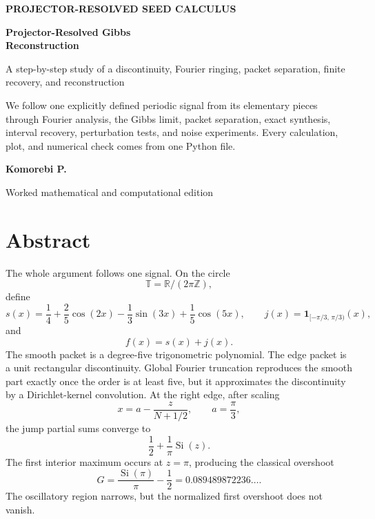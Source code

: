\documentclass[11pt,oneside]{book}
\theoremstyle{remark}
\newcommand{\Torus}{\mathbb T}
\newcommand{\R}{\mathbb R}
\newcommand{\Z}{\mathbb Z}
\newcommand{\Si}{\operatorname{Si}}
\begin{document}
\begin{titlepage}
\thispagestyle{empty}
\centering
{}
\vspace*{0.52in}
{\large\color{Blue}\bfseries PROJECTOR-RESOLVED SEED CALCULUS\par}
\vspace{0.18in}
{\fontsize{32}{37}\selectfont\bfseries Projector-Resolved Gibbs\\Reconstruction\par}
\vspace{0.14in}
{\fontsize{20}{24}\selectfont\color{Muted} A step-by-step study of a discontinuity, Fourier ringing, packet separation, finite recovery, and reconstruction\par}
\vspace{0.42in}
\begin{minipage}{0.83\linewidth}
\large
We follow one explicitly defined periodic signal from its elementary pieces through Fourier analysis, the Gibbs limit, packet separation, exact synthesis, interval recovery, perturbation tests, and noise experiments. Every calculation, plot, and numerical check comes from one Python file.
\end{minipage}
\vfill
{\Large\bfseries Komorebi P.\par}
\vspace{0.25in}
{\large Worked mathematical and computational edition\par}
\end{titlepage}

\frontmatter

\chapter*{Abstract}
The whole argument follows one signal. On the circle
\[
\Torus=\R/(2\pi\Z),
\]
define
\[
 s(x)=\frac14+\frac25\cos(2x)-\frac13\sin(3x)+\frac15\cos(5x),
\qquad
 j(x)=\mathbf 1_{[-\pi/3,\,\pi/3)}(x),
\]
and
\[
 f(x)=s(x)+j(x).
\]
The smooth packet is a degree-five trigonometric polynomial. The edge packet is a unit rectangular discontinuity. Global Fourier truncation reproduces the smooth part exactly once the order is at least five, but it approximates the discontinuity by a Dirichlet-kernel convolution. At the right edge, after scaling
\[
 x=a-\frac{z}{N+1/2},\qquad a=\frac\pi3,
\]
the jump partial sums converge to
\[
 \frac12+\frac1\pi\Si(z).
\]
The first interior maximum occurs at $z=\pi$, producing the classical overshoot
\[
 G=\frac{\Si(\pi)}{\pi}-\frac12
 =0.089489872236\ldots.
\]
The oscillatory region narrows, but the normalized first overshoot does not vanish.
\end{document}
